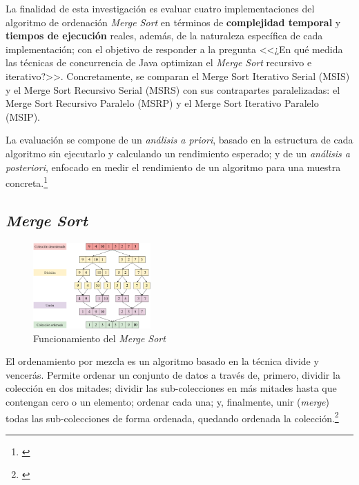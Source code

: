 \documentclass[titlepage]{article}
\begin{document}
La finalidad de esta investigación es evaluar cuatro implementaciones del algoritmo de ordenación \textit{Merge Sort} en términos de \textbf{complejidad temporal} y \textbf{tiempos de ejecución} reales, además, de la naturaleza específica de cada implementación; con el objetivo de responder a la pregunta <<¿En qué medida las técnicas de concurrencia de Java optimizan el \textit{Merge Sort} recursivo e iterativo?>>. Concretamente, se comparan el Merge Sort Iterativo Serial (MSIS) y el Merge Sort Recursivo Serial (MSRS) con sus contrapartes paralelizadas: el Merge Sort Recursivo Paralelo (MSRP) y el Merge Sort Iterativo Paralelo (MSIP).

La evaluación se compone de un \textit{análisis a priori}, basado en la estructura de cada algoritmo sin ejecutarlo y calculando un rendimiento esperado; y de un \textit{análisis a posteriori}, enfocado en medir el rendimiento de un algoritmo para una muestra concreta.\footnote{\cite{shoolini2025}}


\subsection{\textit{Merge Sort}} %

\begin{figure}
	\vspace{-10pt}
	\centering
	\includegraphics[width=0.4\textwidth]{Diagrames/arbolMS.png}
	\captionsetup{justification=centering}
	\caption{Funcionamiento del \textit{Merge Sort}}
	\label{fig:arbolMS2}
\end{figure}

El ordenamiento por mezcla es un algoritmo basado en la técnica divide y vencerás. Permite ordenar un conjunto de datos a través de, primero, dividir la colección en dos mitades; dividir las sub-colecciones en más mitades hasta que contengan cero o un elemento; ordenar cada una; y, finalmente, unir (\textit{merge}) todas las sub-colecciones de forma ordenada, quedando ordenada la colección.\footnote{\cite{skiena-2008}}
\end{document}
